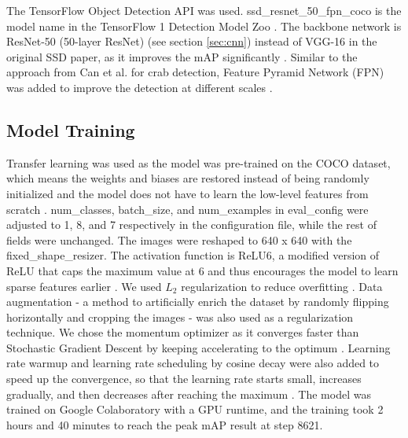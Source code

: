 \documentclass[a4paper, 11pt, oneside]{article}
\begin{document}
The TensorFlow Object Detection API \cite{huang2017speed, tfobjectdetection} was used. ssd\_resnet\_50\_fpn\_coco
is the model name in the TensorFlow 1 Detection Model Zoo \cite{tf1detectionmodelzoo}. The backbone network
is ResNet-50 (50-layer ResNet) (see section \ref{sec:cnn}) instead of VGG-16 in the original SSD paper, as it
improves the mAP significantly \cite{he2016deep}. Similar to the approach from Can et al. \cite{cao2020real} for crab
detection, Feature Pyramid Network (FPN) was added to improve the detection at different scales \cite{lin2017feature}.

\subsection{Model Training}

Transfer learning \cite{torrey2010transfer} was used as the model was pre-trained on the COCO dataset, which means the
weights and biases are restored instead of being randomly initialized and the model does not have to learn the low-level
features from scratch \cite{geron2019hands}. num\_classes, batch\_size, and num\_examples in eval\_config were adjusted
to 1, 8, and 7 respectively in the configuration file, while the rest of fields were unchanged. The images were reshaped
to 640 x 640 with the fixed\_shape\_resizer. The activation function is ReLU6, a modified version of ReLU that caps
the maximum value at 6 and thus encourages the model to learn sparse features earlier
\cite{krizhevsky2010convolutional}. We used $L_2$ regularization \cite{ng2004feature} to reduce overfitting
\cite{hawkins2004problem}. Data augmentation \cite{krizhevsky2012imagenet} - a method to artificially enrich the
dataset by randomly flipping horizontally and cropping the images - was also used as a regularization technique.
We chose the momentum optimizer \cite{polyak1964some} as it converges faster than Stochastic Gradient Descent
\cite{bottou2010large} by keeping accelerating to the optimum \cite{geron2019hands}. Learning rate warmup and learning
rate scheduling by cosine decay were also added to speed up the convergence, so that the learning rate starts small,
increases gradually, and then decreases after reaching the maximum
\cite{geron2019hands, goyal2017accurate, senior2013empirical, loshchilov2016sgdr}.
The model was trained on Google Colaboratory \cite{colab} with a GPU runtime, and the training took 2 hours and 40
minutes to reach the peak mAP result at step 8621.
\end{document}
